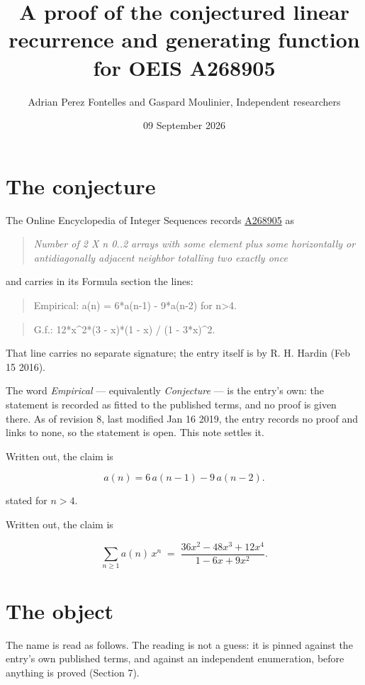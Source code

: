 \documentclass[11pt]{article}
\title{A proof of the conjectured linear recurrence and generating function for OEIS A268905}
\author{Adrian Perez Fontelles and Gaspard Moulinier, Independent researchers}
\date{09 September 2026}
\theoremstyle{definition}
\begin{document}
\maketitle
\section{The conjecture}

The Online Encyclopedia of Integer Sequences records \href{https://oeis.org/A268905}{A268905} as

\begin{quote}\itshape Number of 2 X n 0..2 arrays with some element plus some horizontally or antidiagonally adjacent neighbor totalling two exactly once\end{quote}

and carries in its Formula section the lines:

\begin{quote}\ttfamily Empirical: a(n) = 6*a(n-1) - 9*a(n-2) for n>4.\end{quote}

\begin{quote}\ttfamily G.f.: 12*x\textasciicircum{}2*(3 - x)*(1 - x) / (1 - 3*x)\textasciicircum{}2.\end{quote}

That line carries no separate signature; the entry itself is by R. H. Hardin (Feb 15 2016).

The word {\itshape Empirical} --- equivalently {\itshape Conjecture} --- is the entry's own: the statement is recorded as fitted to the published terms, and no proof is given there. As of revision 8, last modified Jan 16 2019, the entry records no proof and links to none, so the statement is open. This note settles it.

Written out, the claim is

\[a(n) = 6\,a(n-1) - 9\,a(n-2).\]

stated for $n > 4$.

Written out, the claim is

\[\sum_{n \ge 1} a(n)\,x^n \;=\; \frac{36x^{2} - 48x^{3} + 12x^{4}}{1 - 6x + 9x^{2}}.\]

\section{The object}

The name is read as follows. The reading is not a guess: it is pinned against the entry's own published terms, and against an independent enumeration, before anything is proved (Section 7).
\end{document}
